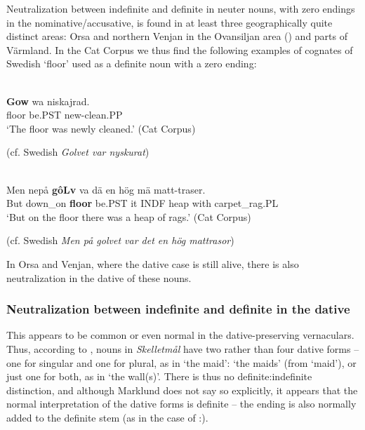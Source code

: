 Neutralization between indefinite and definite in neuter nouns, with zero endings in the nominative/accusative, is found in at least three geographically quite distinct areas: Orsa and northern Venjan in the Ovansiljan area (\citet[133]{Levander1928}) and parts of Värmland. In the Cat Corpus we thus find the following examples of cognates of Swedish  ‘floor’ used as a definite noun with a zero ending:

\ea\label{}
\\
\gll	\textbf{Gow} wa  niskajrad.\\
		floor  be.PST  new-clean.PP\\
\glt 	‘The floor was newly cleaned.’ (Cat Corpus)

\z

(cf. Swedish \textit{Golvet var nyskurat}) 


\ea\label{}
\\
\gll	Men  nepå  \textbf{gôLv} va  dä  en  hög  mä  matt-traser.\\
		But  down\_on  \textbf{floor} be.PST  it  INDF  heap  with  carpet\_rag.PL\\
\glt	‘But on the floor there was a heap of rags.’ (Cat Corpus)

\z

(cf. Swedish \textit{Men på golvet var det en hög mattrasor})


In Orsa and Venjan, where the dative case is still alive, there is also neutralization in the dative of these nouns. 

\subsubsection{Neutralization between indefinite and definite in the dative}
 This appears to be common or even normal in the dative-preserving vernaculars. Thus, according to \citet{Marklund1976}, nouns in \textit{Skelletmål} have two rather than four dative forms – one for singular and one for plural, as in  ‘the maid’:  ‘the maids’ (from  ‘maid’), or just one for both, as in ‘the wall(s)’. There is thus no definite:indefinite distinction, and although Marklund does not say so explicitly, it appears that the normal interpretation of the dative forms is definite – the ending is also normally added to the definite stem (as in the case of :).

